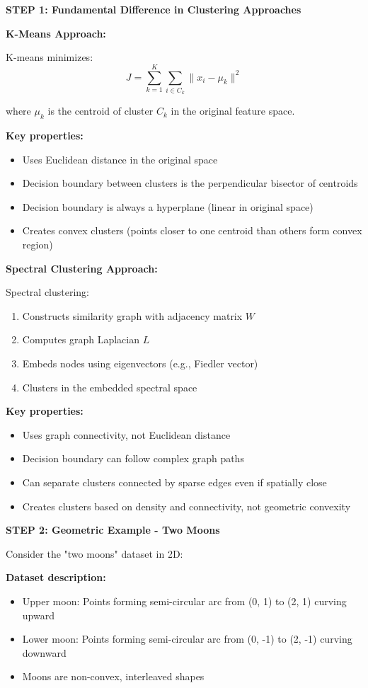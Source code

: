 \documentclass[12pt]{article}
\begin{document}
\begin{solution}

\textbf{STEP 1: Fundamental Difference in Clustering Approaches}

\textbf{K-Means Approach:}

K-means minimizes:
\[
J = \sum_{k=1}^K \sum_{i \in C_k} \|x_i - \mu_k\|^2
\]

where $\mu_k$ is the centroid of cluster $C_k$ in the original feature space.

\textbf{Key properties:}
\begin{itemize}
    \item Uses Euclidean distance in the original space
    \item Decision boundary between clusters is the perpendicular bisector of centroids
    \item Decision boundary is always a hyperplane (linear in original space)
    \item Creates convex clusters (points closer to one centroid than others form convex region)
\end{itemize}

\textbf{Spectral Clustering Approach:}

Spectral clustering:
\begin{enumerate}
    \item Constructs similarity graph with adjacency matrix $W$
    \item Computes graph Laplacian $L$
    \item Embeds nodes using eigenvectors (e.g., Fiedler vector)
    \item Clusters in the embedded spectral space
\end{enumerate}

\textbf{Key properties:}
\begin{itemize}
    \item Uses graph connectivity, not Euclidean distance
    \item Decision boundary can follow complex graph paths
    \item Can separate clusters connected by sparse edges even if spatially close
    \item Creates clusters based on density and connectivity, not geometric convexity
\end{itemize}

\textbf{STEP 2: Geometric Example - Two Moons}

Consider the "two moons" dataset in 2D:

\textbf{Dataset description:}
\begin{itemize}
    \item Upper moon: Points forming semi-circular arc from (0, 1) to (2, 1) curving upward
    \item Lower moon: Points forming semi-circular arc from (0, -1) to (2, -1) curving downward
    \item Moons are non-convex, interleaved shapes
\end{itemize}


\end{solution}
\end{document}
